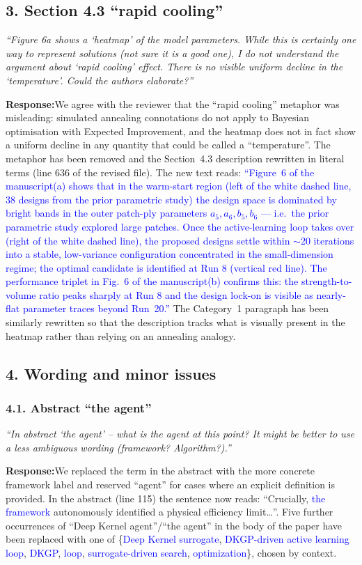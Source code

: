\documentclass[11pt,a4paper]{article}
\newcommand{\new}[1]{\textcolor{blue}{#1}}
\newcommand{\rev}[1]{\par\noindent\textit{\small #1}\par\smallskip}
\newcommand{\resp}{\par\noindent\textbf{Response:}\space}
\begin{document}
\subsection*{3. Section 4.3 ``rapid cooling''}
\rev{``Figure 6a shows a `heatmap' of the model parameters. While this is certainly one way to represent solutions (not sure it is a good one), I do not understand the argument about `rapid cooling' effect. There is no visible uniform decline in the `temperature'. Could the authors elaborate?''}
\resp We agree with the reviewer that the ``rapid cooling'' metaphor was misleading: simulated annealing connotations do not apply to Bayesian optimisation with Expected Improvement, and the heatmap does not in fact show a uniform decline in any quantity that could be called a ``temperature''. The metaphor has been removed and the Section~4.3 description rewritten in literal terms (line 636 of the revised file). The new text reads: \new{``Figure~6 of the manuscript(a) shows that in the warm-start region (left of the white dashed line, 38 designs from the prior parametric study) the design space is dominated by bright bands in the outer patch-ply parameters $a_5, a_6, b_5, b_6$ --- i.e.\ the prior parametric study explored large patches. Once the active-learning loop takes over (right of the white dashed line), the proposed designs settle within $\sim$20 iterations into a stable, low-variance configuration concentrated in the small-dimension regime; the optimal candidate is identified at Run 8 (vertical red line). The performance triplet in Fig.~6 of the manuscript(b) confirms this: the strength-to-volume ratio peaks sharply at Run 8 and the design lock-on is visible as nearly-flat parameter traces beyond Run~20.''} The Category~1 paragraph has been similarly rewritten so that the description tracks what is visually present in the heatmap rather than relying on an annealing analogy.

\subsection*{4. Wording and minor issues}

\subsubsection*{4.1. Abstract ``the agent''}
\rev{``In abstract `the agent' -- what is the agent at this point? It might be better to use a less ambiguous wording (framework? Algorithm?).''}
\resp We replaced the term in the abstract with the more concrete framework label and reserved ``agent'' for cases where an explicit definition is provided. In the abstract (line 115) the sentence now reads: ``Crucially, \new{the framework} autonomously identified a physical efficiency limit\ldots''. Five further occurrences of ``Deep Kernel agent''/``the agent'' in the body of the paper have been replaced with one of \{\new{Deep Kernel surrogate}, \new{DKGP-driven active learning loop}, \new{DKGP}, \new{loop}, \new{surrogate-driven search}, \new{optimization}\}, chosen by context.
\end{document}
